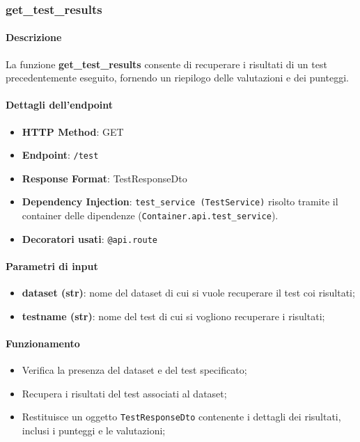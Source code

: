 \subsubsection{get\_test\_results}
\label{subsubsec:gettestresults}

\paragraph{Descrizione}
La funzione \textbf{get\_test\_results} consente di recuperare i risultati di un test precedentemente eseguito, fornendo un riepilogo delle valutazioni e dei punteggi.

\paragraph{Dettagli dell'endpoint}
\begin{itemize}
    \item \textbf{HTTP Method}: GET
    \item \textbf{Endpoint}: \texttt{/test}
    \item \textbf{Response Format}: TestResponseDto
    \item \textbf{Dependency Injection}: \texttt{test\_service (TestService)} risolto tramite il container delle dipendenze (\texttt{Container.api.test\_service}).
    \item \textbf{Decoratori usati}: \texttt{@api.route}
\end{itemize}

\paragraph{Parametri di input}
\begin{itemize}
    \item \textbf{dataset (str)}: nome del dataset di cui si vuole recuperare il test coi risultati;
    \item \textbf{testname (str)}: nome del test di cui si vogliono recuperare i risultati;
\end{itemize}

\paragraph{Funzionamento}
\begin{itemize}
    \item Verifica la presenza del dataset e del test specificato;
    \item Recupera i risultati del test associati al dataset;
    \item Restituisce un oggetto \texttt{TestResponseDto} contenente i dettagli dei risultati, inclusi i punteggi e le valutazioni;
\end{itemize}

